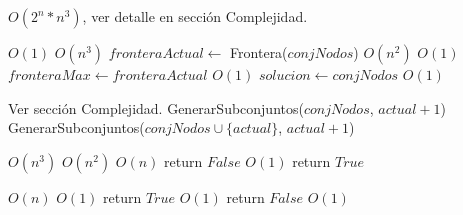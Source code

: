 \begin{algorithm}[H]
\begin{algorithmic}
 \Comment $O(2^{n} * n^{3})$, ver detalle en sección Complejidad.

                      \Comment $O(1)$
             \Comment $O(n^3)$
            \State $fronteraActual \gets$ Frontera($conjNodos$) \Comment $O(n^2)$
                      \Comment $O(1)$
                \State $fronteraMax \gets fronteraActual$ \Comment $O(1)$
                \State $solucion \gets conjNodos$         \Comment $O(1)$
            \EndIf
        \EndIf

    \Else \Comment Ver sección Complejidad.
        \State GenerarSubconjuntos($conjNodos$, $actual + 1$)
        \State GenerarSubconjuntos($conjNodos \cup \{actual\}$, $actual + 1$)
    \EndIf
\EndFunction
\end{algorithmic}
\end{algorithm}

\begin{algorithm}[H]
\begin{algorithmic}
                         \Comment $O(n^3)$
                         \Comment $O(n^2)$
              \Comment $O(n)$
                \State return $False$                   \Comment $O(1)$
            \EndIf
        \EndFor
    \EndFor
    \State return $True$
\EndFunction
\end{algorithmic}
\end{algorithm}

\begin{algorithm}[H]
\begin{algorithmic}
        \Comment $O(n)$
                    \Comment $O(1)$
            \State return $True$ \Comment $O(1)$
        \EndIf
    \EndFor
    \State return $False$        \Comment $O(1)$

\EndFunction
\end{algorithmic}
\end{algorithm}

